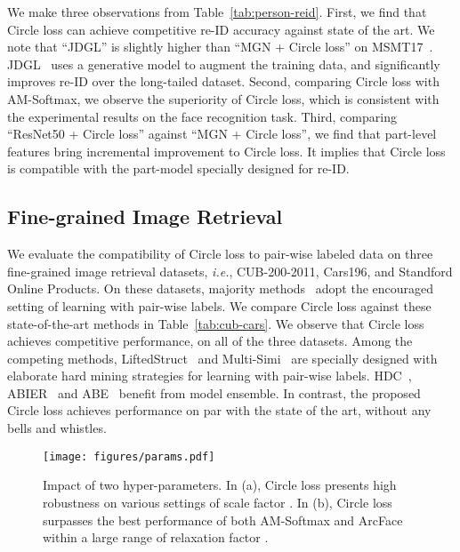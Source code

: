 \documentclass[10pt,twocolumn,letterpaper]{article}
\begin{document}
We make three observations from Table~\ref{tab:person-reid}. First, we find that Circle loss can achieve competitive re-ID accuracy against state of the art. We note that ``JDGL'' is slightly higher than ``MGN + Circle loss'' on MSMT17~\cite{Wei_2018_CVPRMSMT17}. JDGL~\cite{Zheng_2019_CVPRJDGL} uses a generative model to augment the training data, and significantly improves re-ID over the long-tailed dataset. Second, comparing Circle loss with AM-Softmax, we observe the superiority of Circle loss, which is consistent with the experimental results on the face recognition task. Third, comparing ``ResNet50 + Circle loss'' against ``MGN + Circle loss'', we find that part-level features bring incremental improvement to Circle loss. It implies that Circle loss is compatible with the part-model specially designed for re-ID. 



\subsection{Fine-grained Image Retrieval}\label{sec:exp_finegrain}
\vspace{0.5em}
We evaluate the compatibility of Circle loss to pair-wise labeled data on three fine-grained image retrieval datasets, \emph{i.e.}, CUB-200-2011, Cars196, and Standford Online Products. On these datasets, majority methods~\cite{oh2016deep,Song_2017_CVPRHDC,Ge_2018_ECCVHTL,ABIER,Kim_2018_ECCVABE,wang2019multi} adopt the encouraged setting of learning with pair-wise labels. We compare Circle loss against these state-of-the-art methods in Table~\ref{tab:cub-cars}. We observe that Circle loss achieves competitive performance, on all of the three datasets. Among the competing methods, LiftedStruct~\cite{oh2016deep} and Multi-Simi~\cite{wang2019multi} are specially designed with elaborate hard mining strategies for learning with pair-wise labels. HDC~\cite{Song_2017_CVPRHDC}, ABIER~\cite{ABIER} and ABE~\cite{Kim_2018_ECCVABE} benefit from model ensemble. In contrast, the proposed Circle loss achieves performance on par with the state of the art, without any bells and whistles. 

\begin{figure}[t]
\centering
  \texttt{[image: figures/params.pdf]}  
  \caption{Impact of two hyper-parameters. In (a), Circle loss presents high robustness on various settings of scale factor . In (b), Circle loss surpasses the best performance of both AM-Softmax and ArcFace within a large range of relaxation factor . }
\label{fig:params}
\end{figure}
\end{document}
